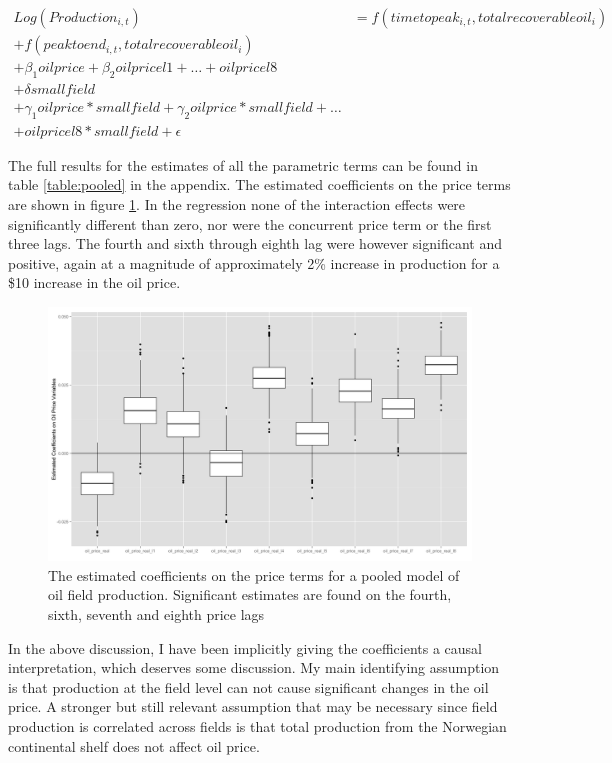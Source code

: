 \documentclass[12pt]{article}
\begin{document}
\begin{multline}
	Log(Production_{i,t})&=f(timetopeak_{i,t}, totalrecoverableoil_i) \\
	+ f(peaktoend_{i,t}, totalrecoverableoil_i) \\
	+ \beta_1 oilprice + \beta_2 oilpricel1 + \dots + oilpricel8\\
	+ \delta smallfield \\
 	+ \gamma_1 oilprice*smallfield + \gamma_2 oilprice*smallfield + \dots \\
 	 + oilpricel8*smallfield +  \epsilon
\label{pooled_eqn}
\end{multline}

The full results for the estimates of all the parametric terms can be found in table \ref{table:pooled} in the appendix.  The estimated coefficients on the price terms are shown in figure \ref{gam_price_pooled}. In the regression none of the interaction effects were significantly different than zero, nor were the concurrent price term or the first three lags.  The fourth and sixth through eighth lag were however significant and positive, again at a magnitude of approximately 2\% increase in production for a \$10 increase in the oil price.

\begin{figure}
	\includegraphics[width=1\textwidth]{figures/gam_price_pooled_print.png}
	\caption{The estimated coefficients on the price terms for a pooled model of oil field production.  Significant estimates are found on the fourth, sixth, seventh and eighth price lags}
	\label{gam_price_pooled}
\end{figure}

In the above discussion, I have been implicitly giving the coefficients a causal interpretation, which deserves some discussion.  My main identifying assumption is that production at the field level can not cause significant changes in the oil price.  A stronger but still relevant assumption that may be necessary since field production is correlated across fields is that total production from the Norwegian continental shelf does not affect oil price.  
\end{document}
